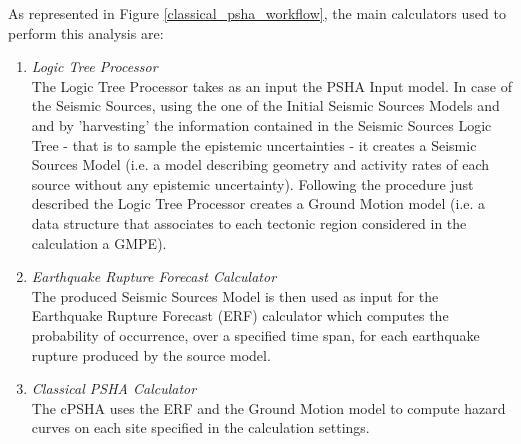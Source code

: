 As represented in Figure \ref{classical_psha_workflow}, the main calculators 
used to perform this analysis are:
\begin{enumerate}
%
\item \emph{Logic Tree Processor} \hfill \\
The Logic Tree Processor takes as an input the PSHA Input model. In case of 
the Seismic Sources, using the one of the Initial Seismic Sources Models and 
and by 'harvesting' the information contained in the Seismic Sources Logic Tree
- that is to sample the epistemic uncertainties - it creates a Seismic Sources 
Model (i.e. a model describing geometry and activity rates of each source 
without any epistemic uncertainty). 
%
Following the procedure just described the Logic Tree Processor creates a 
Ground Motion model (i.e. a data structure that associates to each tectonic 
region considered in the calculation a GMPE).
%
\item \emph{Earthquake Rupture Forecast Calculator} \hfill \\
The produced Seismic Sources Model is then used as input for the Earthquake 
Rupture Forecast (ERF) calculator which computes the probability of occurrence, 
over a specified time span, for each earthquake rupture produced by the source 
model.
\item \emph{Classical PSHA Calculator} \hfill \\
The cPSHA uses the ERF and the Ground Motion model to compute hazard curves on 
each site specified in the calculation settings.
\end{enumerate} 
%
